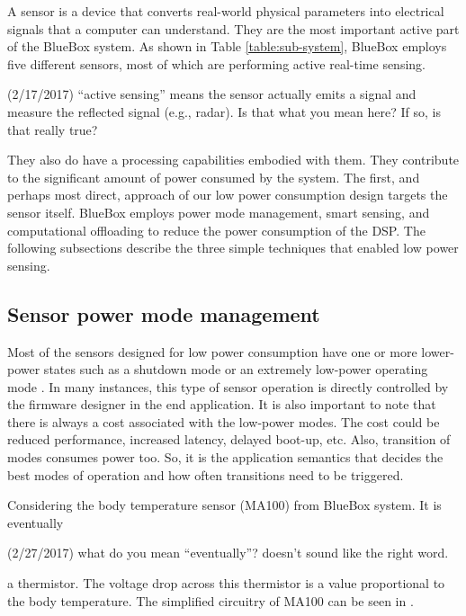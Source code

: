 A sensor is a device that converts real-world physical parameters
into electrical signals that a computer can understand. They are the
most important active part of the BlueBox system. As shown in Table
\ref{table:sub-system}, BlueBox employs five different sensors, most
of which are performing active real-time sensing.
\begin{cmtPai}
	(2/17/2017) ``active sensing'' means the sensor actually emits a
	signal and measure the reflected signal (e.g., radar). Is that what
	you mean here? If so, is that really true?
\end{cmtPai}

They also do have a processing capabilities embodied with them. They
contribute to the significant amount of power consumed by the system.
The first, and perhaps most direct, approach of our low power
consumption design targets the sensor itself. BlueBox employs power
mode management, smart sensing, and computational offloading to
reduce the power consumption of the DSP. The following subsections
describe the three simple techniques that enabled low power sensing.

 \subsection{Sensor power mode management}

Most of the sensors designed for low power consumption have one or
more lower-power states such as a shutdown mode or an extremely
low-power operating mode \cite{lowpwrsensing}. In many instances,
this type of sensor operation is directly controlled by the firmware
designer in the end application. It is also important to note that
there is always a cost associated with the low-power modes.  The cost
could be reduced performance, increased latency, delayed boot-up,
etc. Also, transition of modes consumes power too. So, it is the
application semantics that decides the best modes of operation and
how often transitions need to be triggered. 
 
Considering the body temperature sensor (MA100) from BlueBox system.
It is eventually
\begin{cmtPai}
	(2/27/2017) what do you mean ``eventually''?  doesn't sound like
	the right word.
\end{cmtPai}
a thermistor. The voltage drop across this thermistor is a value
proportional to the body temperature. The simplified circuitry of
MA100 can be seen in .

